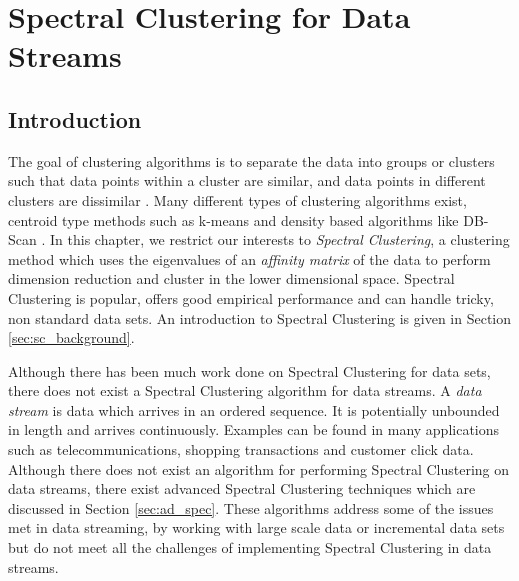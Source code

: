 % 
\graphicspath{{Chapter2/figures/}} 

\chapter{Spectral Clustering for Data Streams}
\label{chap:spectral}
\section{Introduction}
\label{sec:datastreams_intro}

The goal of clustering algorithms is to separate the data into groups or clusters such that data points within a cluster are similar, and data points in different clusters are dissimilar \citep{Everitt2001}. Many different types of clustering algorithms exist, centroid type methods such as k-means \citep{MacQueen1967, Lloyd1982} and density based algorithms like DB-Scan \citep{Ester1996}. In this chapter, we restrict our interests to \textit{Spectral Clustering}, a clustering method which uses the eigenvalues of an \textit{affinity matrix} of the data to perform dimension reduction and cluster in the lower dimensional space. Spectral Clustering is popular, offers good empirical performance and can handle tricky, non standard data sets. An introduction to Spectral Clustering is given in Section \ref{sec:sc_background}. 

Although there has been much work done on Spectral Clustering for data sets, there does not exist a Spectral Clustering algorithm for data streams. A \textit{data stream} \citep{Gama2010, Silva2013} is data which arrives in an ordered sequence. It is potentially unbounded in length and arrives continuously. Examples can be found in many applications such as telecommunications, shopping transactions and customer click data. Although there does not exist an algorithm for performing Spectral Clustering on data streams, there exist advanced Spectral Clustering techniques which are discussed in Section \ref{sec:ad_spec}. These algorithms address some of the issues met in data streaming, by working with large scale data or incremental data sets but do not meet all the challenges of implementing Spectral Clustering in data streams.

